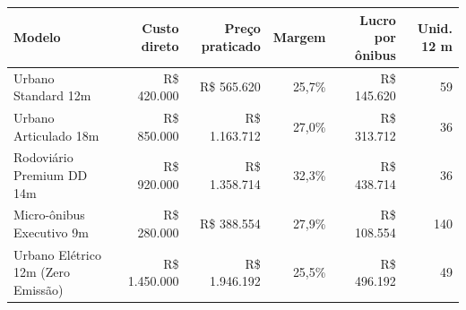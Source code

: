 \begin{tabular}{@{}p{}rrrrr@{}}
\toprule
\textbf{Modelo} & \textbf{Custo direto} & \textbf{Preço praticado} & \textbf{Margem} & \textbf{Lucro por ônibus} & \textbf{Unid. 12 m} \\
\midrule
Urbano Standard 12m & R\$ 420.000 & R\$ 565.620 & 25,7\% & R\$ 145.620 & 59 \\
Urbano Articulado 18m & R\$ 850.000 & R\$ 1.163.712 & 27,0\% & R\$ 313.712 & 36 \\
Rodoviário Premium DD 14m & R\$ 920.000 & R\$ 1.358.714 & 32,3\% & R\$ 438.714 & 36 \\
Micro-ônibus Executivo 9m & R\$ 280.000 & R\$ 388.554 & 27,9\% & R\$ 108.554 & 140 \\
Urbano Elétrico 12m (Zero Emissão) & R\$ 1.450.000 & R\$ 1.946.192 & 25,5\% & R\$ 496.192 & 49 \\
\bottomrule
\end{tabular}
